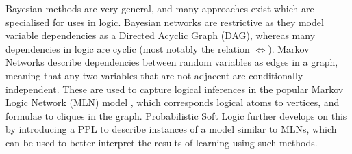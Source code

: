Bayesian methods are very general, and many approaches exist which are specialised for uses in logic. Bayesian networks are restrictive as they model variable dependencies as a Directed Acyclic Graph (DAG), whereas many dependencies in logic are cyclic (most notably the relation $\iff$). Markov Networks describe dependencies between random variables as edges in a graph, meaning that any two variables that are not adjacent are conditionally independent. These are used to capture logical inferences in the popular Markov Logic Network (MLN) model \cite{markovlogicnetworks}, which corresponds logical atoms to vertices, and formulae to cliques in the graph. Probabilistic Soft Logic \cite{probsoftlogic} further develops on this by introducing a PPL to describe instances of a model similar to MLNs, which can be used to better interpret the results of learning using such methods.



